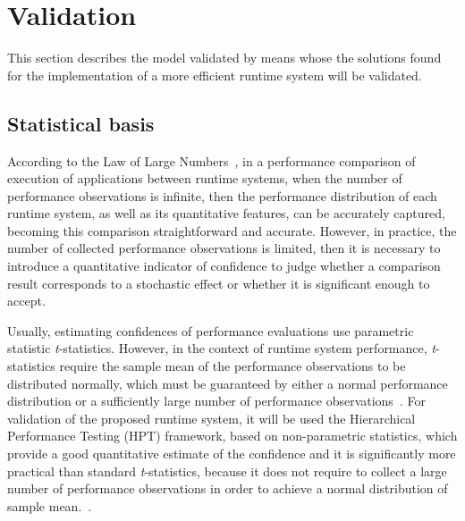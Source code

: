 \section{Validation}
\label{sec:validation}

\noindent 

This section describes the model validated by means whose the solutions found for the implementation of a more efficient runtime system will be validated. 

\subsection{Statistical basis}
\label{subsec:statistical}

According to the Law of Large Numbers~\cite{hoeffding1961}, in a performance comparison of execution of applications between runtime systems, when the number of performance observations is infinite, then the performance distribution of each runtime system, as well as its quantitative features, can be accurately captured, becoming this comparison straightforward and accurate. However, in practice, the number of collected performance observations is limited, then it is necessary to introduce a quantitative indicator of confidence to judge whether a comparison result corresponds to a stochastic effect or whether it is significant enough to accept.

Usually, estimating confidences of performance evaluations use parametric statistic \textit{t}-statistics. However, in the context of runtime system performance, \textit{t}-statistics require the sample mean of the performance observations to be distributed normally, which must be guaranteed by either a normal performance distribution or a sufficiently large number of performance observations~\cite{sitthi2006}. For validation of the proposed runtime system, it will be used the Hierarchical Performance Testing (HPT) framework, based on non-parametric statistics, which provide a good quantitative estimate of the confidence and it is significantly more practical than standard \textit{t}-statistics, because it does not require to collect a large number of performance observations in order to achieve a normal distribution of sample mean.~\cite{chen2015}. 


